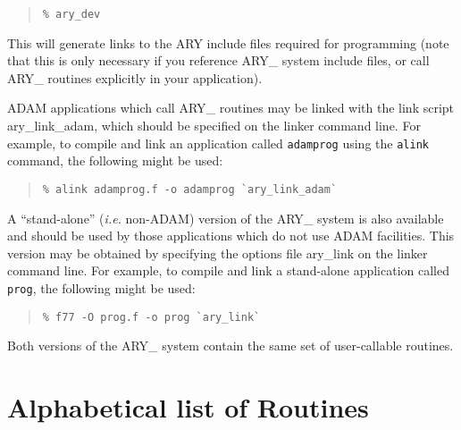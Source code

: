 \documentclass[twoside,11pt]{article}
\newcommand{\xlabel}[1]{}
\begin{document}
\begin{quote}\begin{verbatim}
% ary_dev
\end{verbatim}\end{quote}

This will generate links to the ARY include files required for 
programming (note that this is only necessary if you reference ARY\_
system include files, or call ARY\_ routines explicitly in your
application).

ADAM applications which call ARY\_ routines may be linked with the link
script \mbox{ary\_link\_adam}, which should be specified on the linker
command line.  For example, to compile and link an application called
\texttt{adamprog} using the \texttt{alink} command, the following might be
used:

\begin{quote}\begin{verbatim}
% alink adamprog.f -o adamprog `ary_link_adam`
\end{verbatim}\end{quote}

A ``stand-alone'' (\emph{i.e.} non-ADAM) version of the ARY\_ system is
also available and should be used by those applications which do not
use ADAM facilities.  This version may be obtained by specifying the
options file \mbox{ary\_link} on the linker command line.  For example,
to compile and link a stand-alone application called \texttt{prog}, the
following might be used:

\begin{quote}\begin{verbatim}
% f77 -O prog.f -o prog `ary_link`
\end{verbatim}\end{quote}

Both versions of the ARY\_ system contain the same set of user-callable
routines.  

\newpage
\appendix

\section{\xlabel{alphabetical_list_of_routines}Alphabetical list of Routines}
\label{alphabetical_list_of_routines}
\end{document}
